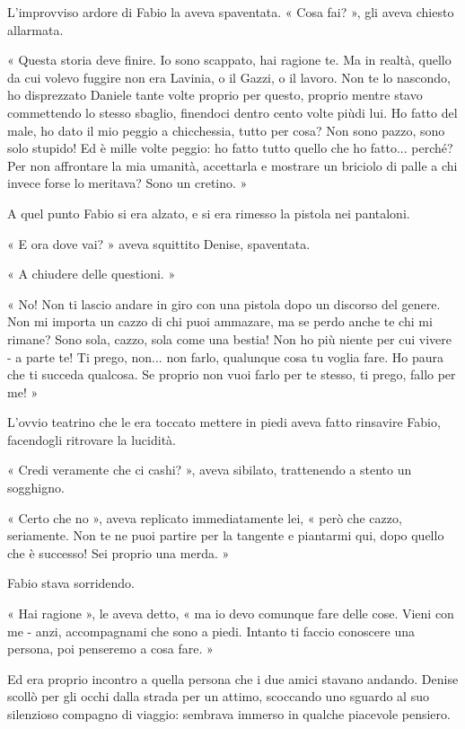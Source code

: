 L'improvviso ardore di Fabio la aveva spaventata. « Cosa fai? », gli aveva chiesto allarmata.

« Questa storia deve finire. Io sono scappato, hai ragione te. Ma in realtà, quello da cui volevo fuggire non era Lavinia, o il Gazzi, o il lavoro. Non te lo nascondo, ho disprezzato Daniele tante volte proprio per questo, proprio mentre stavo commettendo lo stesso sbaglio, finendoci dentro cento volte piùdi lui. Ho fatto del male, ho dato il mio peggio a chicchessia, tutto per cosa? Non sono pazzo, sono solo stupido! Ed è mille volte peggio: ho fatto tutto quello che ho fatto... perché? Per non affrontare la mia umanità, accettarla e mostrare un briciolo di palle a chi invece forse lo meritava? Sono un cretino. »

A quel punto Fabio si era alzato, e si era rimesso la pistola nei pantaloni.

« E ora dove vai? » aveva squittito Denise, spaventata.

« A chiudere delle questioni. »

« No! Non ti lascio andare in giro con una pistola dopo un discorso del genere. Non mi importa un cazzo di chi puoi ammazare, ma se perdo anche te chi mi rimane? Sono sola, cazzo, sola come una bestia! Non ho più niente per cui vivere - a parte te! Ti prego, non... non farlo, qualunque cosa tu voglia fare. Ho paura che ti succeda qualcosa. Se proprio non vuoi farlo per te stesso, ti prego, fallo per me! »

L'ovvio teatrino che le era toccato mettere in piedi aveva fatto rinsavire Fabio, facendogli ritrovare la lucidità.

« Credi veramente che ci cashi? », aveva sibilato, trattenendo a stento un sogghigno.

« Certo che no », aveva replicato immediatamente lei, « però che cazzo, seriamente. Non te ne puoi partire per la tangente e piantarmi qui, dopo quello che è successo! Sei proprio una merda. »

Fabio stava sorridendo.

« Hai ragione », le aveva detto, « ma io devo comunque fare delle cose. Vieni con me - anzi, accompagnami che sono a piedi. Intanto ti faccio conoscere una persona, poi penseremo a cosa fare. »

Ed era proprio incontro a quella persona che i due amici stavano andando. Denise scollò per gli occhi dalla strada per un attimo, scoccando uno sguardo al suo silenzioso compagno di viaggio: sembrava immerso in qualche piacevole pensiero.

